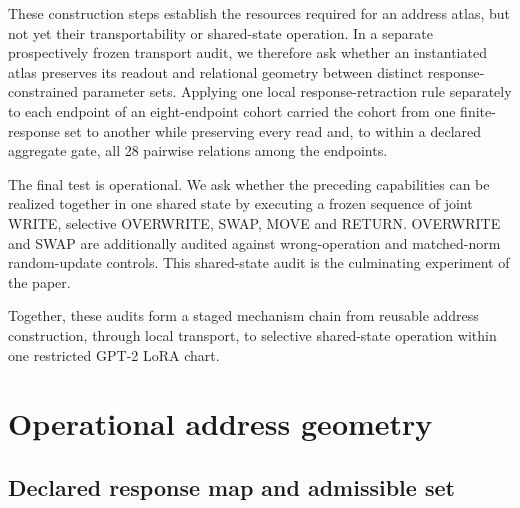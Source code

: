 \documentclass[11pt]{article}
\begin{document}
These construction steps establish the resources required for an address atlas, but not yet their
transportability or shared-state operation. In a separate prospectively frozen transport audit, we therefore
ask whether an instantiated atlas preserves its readout and relational geometry between distinct
response-constrained parameter sets. Applying one local response-retraction rule separately to each endpoint of
an eight-endpoint cohort carried the cohort from one finite-response set to another while preserving every read
and, to within a declared aggregate gate, all 28 pairwise relations among the endpoints.

The final test is operational. We ask whether the preceding capabilities can be realized together in one
shared state by executing a frozen sequence of joint WRITE, selective OVERWRITE, SWAP, MOVE and RETURN.
OVERWRITE and SWAP are additionally audited against wrong-operation and matched-norm random-update controls.
This shared-state audit is the culminating experiment of the paper.

Together, these audits form a staged mechanism chain from reusable address construction, through local
transport, to selective shared-state operation within one restricted GPT-2 LoRA chart.

\section{Operational address geometry}

\subsection{Declared response map and admissible set}
\end{document}
